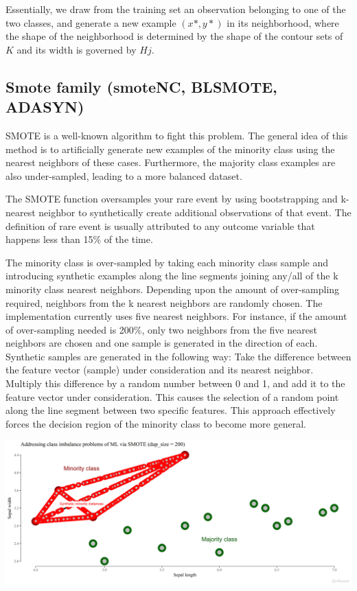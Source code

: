 \documentclass[
]{report}
\begin{document}
Essentially, we draw from the training set an observation belonging to one of the two classes, and generate a new example \((x*, y*)\) in its neighborhood, where the shape of the neighborhood is determined by the shape of the contour sets of \(K\) and its width is governed by \(Hj\).

\hypertarget{smote-family-smotenc-blsmote-adasyn}{%
\subsection{Smote family (smoteNC, BLSMOTE, ADASYN)}\label{smote-family-smotenc-blsmote-adasyn}}

SMOTE is a well-known algorithm to fight this problem. The general idea of this method is to artificially generate new examples of the minority class using the nearest neighbors of these cases. Furthermore, the majority class examples are also under-sampled, leading to a more balanced dataset.

The SMOTE function oversamples your rare event by using bootstrapping and k-nearest neighbor to synthetically create additional observations of that event. The definition of rare event is usually attributed to any outcome variable that happens less than 15\% of the time.

The minority class is over-sampled by taking each minority class sample and introducing synthetic examples along the line segments joining any/all of the k minority class nearest neighbors. Depending upon the amount of over-sampling required, neighbors from the k nearest neighbors are randomly chosen. The implementation currently uses five nearest neighbors. For instance, if the amount of over-sampling needed is 200\%, only two neighbors from the five nearest neighbors are chosen and one sample is generated in the direction of each. Synthetic samples are generated in the following way: Take the difference between the feature vector (sample) under consideration and its nearest neighbor. Multiply this difference by a random number between 0 and 1, and add it to the feature vector under consideration. This causes the selection of a random point along the line segment between two specific features. This approach effectively forces the decision region of the minority class to become more general. \citep{chawla2002}

\begin{center}\includegraphics{smote} \end{center}
\end{document}
